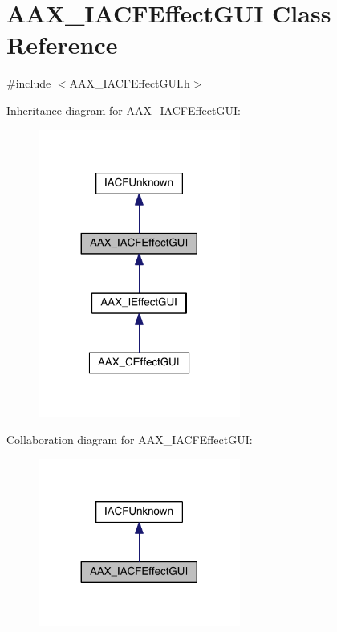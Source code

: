 \hypertarget{a00060}{}\section{A\+A\+X\+\_\+\+I\+A\+C\+F\+Effect\+G\+U\+I Class Reference}
\label{a00060}


{\ttfamily \#include $<$A\+A\+X\+\_\+\+I\+A\+C\+F\+Effect\+G\+U\+I.\+h$>$}



Inheritance diagram for A\+A\+X\+\_\+\+I\+A\+C\+F\+Effect\+G\+U\+I\+:
\nopagebreak
\begin{figure}[H]
\begin{center}
\leavevmode
\includegraphics[width=188pt]{a00523}
\end{center}
\end{figure}


Collaboration diagram for A\+A\+X\+\_\+\+I\+A\+C\+F\+Effect\+G\+U\+I\+:
\nopagebreak
\begin{figure}[H]
\begin{center}
\leavevmode
\includegraphics[width=188pt]{a00524}
\end{center}
\end{figure}


